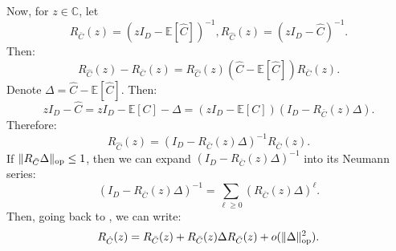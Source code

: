 \documentclass[]{article}
\numberwithin{equation}{section}
\theoremstyle{definition}
\newcommand{\EE}{\mathbb{E}}
\def\op{{\rm op}}
\begin{document}
Now, for $z \in \mathbb{C}$, let
\begin{equation}
    R_{\bar{C}}(z) = (z I _{D} - \EE[\hat{C}])^{-1}, R_{\hat{C}}(z) = (zI_{D} - \hat{C})^{-1}. 
\end{equation}
Then: 
\begin{equation}
    R_{\hat{C}}(z) - R_{\bar{C}}(z) = R_{\hat{C}}(z)(\hat{C} - \EE[\hat{C}]) R_{\bar{C}}(z). 
\end{equation}
Denote $\Delta= \hat{C} - \EE [\hat{C}]$. Then: 
\begin{equation}
    zI_{D} - \hat{C} = z I_{D} - \EE[C] - \Delta = ( z I_{D} - \EE[C] )( I_{D} -R_{\bar{C}}(z)\Delta ).
\end{equation}
Therefore: 
\begin{equation}
    R_{\hat{C}}(z) = ( I_{D} -R_{\bar{C}}(z)\Delta )^{-1} R_{\bar{C}}(z). 
    \label{eq:resolvent_for_hat_C}
\end{equation}
If $\| R_{\bar{C}}\Delta \|_\op \leq 1$, then we can expand  $(I_{D} -R_{\bar{C}}(z)\Delta )^{-1}$ into its Neumann series: 
\begin{equation}
    (I_{D} -R_{\bar{C}}(z)\Delta )^{-1} = \sum_{\ell \geq 0} (R_{\bar{C}}(z)\Delta)^{\ell}. 
\end{equation}
Then, going back to , we can write: 
\begin{equation}
     R_{\hat{C}}(z) = R_{\bar{C}}(z) + R_{\bar{C}}(z) \Delta R_{\bar{C}}(z) + o(\| \Delta \|_\op^{2}). 
     \label{eq:first_order_expansion_resolvent}
\end{equation}
\end{document}

